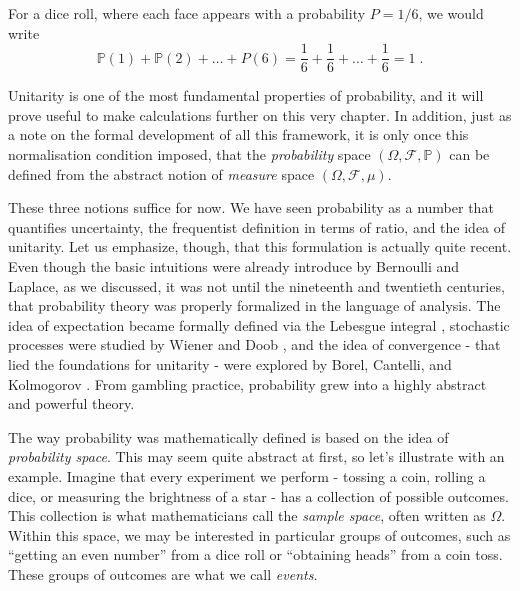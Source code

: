 \documentclass{book}
\begin{document}
For a dice roll, where each face appears with a probability $P = 1/6$, we would write
\begin{equation}
    \mathbb{P}(\text{1}) + \mathbb{P}(\text{2}) + \dots + P(6) = \frac{1}{6} + \frac{1}{6} + \dots + \frac{1}{6} = 1 \; . \nonumber
\end{equation}

Unitarity is one of the most fundamental properties of probability, and it will prove useful to make calculations further on this very chapter. In addition, just as a note on the formal development of all this framework, it is only once this normalisation condition imposed, that the \textit{probability} space $(\Omega,\mathcal{F},\mathbb{P})$ can be defined from the abstract notion of \textit{measure} space $(\Omega,\mathcal{F},\mu)$.

\medskip

These three notions suffice for now. We have seen probability as a number that quantifies uncertainty, the frequentist definition in terms of ratio, and the idea of unitarity. Let us emphasize, though, that this formulation is actually quite recent. Even though the basic intuitions were already introduce by Bernoulli and Laplace, as we discussed, it was not until the nineteenth and twentieth centuries, that probability theory was properly formalized in the language of analysis. The idea of expectation became formally defined via the Lebesgue integral \cite{lebesgue1902}, stochastic processes were studied by Wiener and Doob \cite{doob1953}, and the idea of convergence - that lied the foundations for unitarity - were explored by Borel, Cantelli, and Kolmogorov \cite{billingsley1995}. From gambling practice, probability grew into a highly abstract and powerful theory.

\medskip

The way probability was mathematically defined is based on the idea of \textit{probability space}. This may seem quite abstract at first, so let's illustrate with an example. Imagine that every experiment we perform - tossing a coin, rolling a dice, or measuring the brightness of a star - has a collection of possible outcomes. This collection is what mathematicians call the \textit{sample space}, often written as $\Omega$. Within this space, we may be interested in particular groups of outcomes, such as ``getting an even number'' from a dice roll or ``obtaining heads'' from a coin toss. These groups of outcomes are what we call \textit{events}.

\medskip
\end{document}

